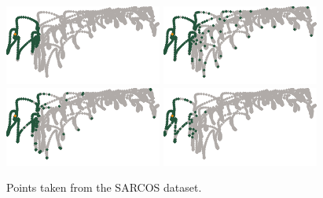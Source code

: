 \documentclass[review,supplement,onefignum,onetabnum]{siamonline220329}
\begin{document}
\begin{figure}[H]
  \centering
  \includegraphics{figures/precompiled/sarcos2/points_1.pdf}%
  \quad
  \includegraphics{figures/precompiled/sarcos2/points_2.pdf}%
  \quad
  \includegraphics{figures/precompiled/sarcos2/points_3.pdf}%
  \quad
  \includegraphics{figures/precompiled/sarcos2/points_4.pdf}%
  \caption{%
    Points taken from the SARCOS dataset.
  }
\end{figure}
\end{document}
